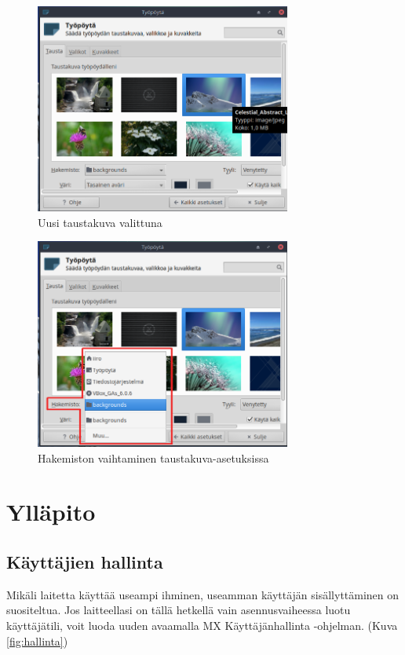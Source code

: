 \documentclass[a4paper, 12pt, finnish]{article}
\begin{document}
\begin{figure}[htpb]
    \begin{center}
        \includegraphics[width=0.75\textwidth]{taustakuva_valittu}
        \caption{Uusi taustakuva valittuna}
        \label{fig:taustakuva2}
    \end{center}
\end{figure}

\begin{figure}[htpb]
    \begin{center}
        \includegraphics[width=0.75\textwidth]{taustakuva_hakemisto}
        \caption{Hakemiston vaihtaminen taustakuva-asetuksissa}
        \label{fig:taustakuva3}
    \end{center}
\end{figure}
\section{Ylläpito}
\subsection{Käyttäjien hallinta}
Mikäli laitetta käyttää useampi ihminen, useamman käyttäjän sisällyttäminen on suositeltua. Jos laitteellasi on tällä hetkellä vain asennusvaiheessa luotu käyttäjätili, voit luoda uuden avaamalla MX Käyttäjänhallinta -ohjelman. (Kuva \ref{fig:hallinta})
\end{document}
